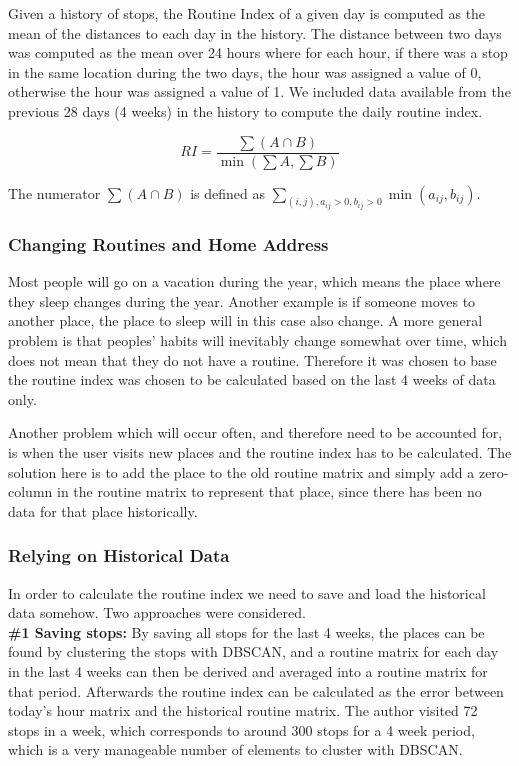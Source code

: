 Given a history of stops, the Routine Index of a given day is computed as the mean of the distances to each day in the history. The distance between two days was computed as the mean over 24 hours where for each hour, if there was a stop in the same location during the two days, the hour was assigned a value of 0, otherwise the hour was assigned a value of 1. We included data available from the previous 28 days (4 weeks) in the history to compute the daily routine index.

$$RI = \frac{\sum (A \cap B)}{\min (\sum A, \sum B)}$$

The numerator $\sum (A \cap B)$ is defined as $\sum_{(i,j) , a_{ij}> 0, b_{ij} > 0} \min (a_{ij}, b_{ij})$.

\subsubsection*{Changing Routines and Home Address}
Most people will go on a vacation during the year, which means the place where they sleep changes during the year. Another example is if someone moves to another place, the place to sleep will in this case also change. A more general problem is that peoples' habits will inevitably change somewhat over time, which does not mean that they do not have a routine. Therefore it was chosen to base the routine index was chosen to be calculated based on the last 4 weeks of data only. 

Another problem which will occur often, and therefore need to be accounted for, is when the user visits new places and the routine index has to be calculated. The solution here is to add the place to the old routine matrix and simply add a zero-column in the routine matrix to represent that place, since there has been no data for that place historically. 

\subsubsection*{Relying on Historical Data}
In order to calculate the routine index we need to save and load the historical data somehow. Two approaches were considered.\\

\textbf{\#1 Saving stops:} By saving all stops for the last 4 weeks, the places can be found by clustering the stops with DBSCAN, and a routine matrix for each day in the last 4 weeks can then be derived and averaged into a routine matrix for that period. Afterwards the routine index can be calculated as the error between today's hour matrix and the historical routine matrix. The author visited 72 stops in a week, which corresponds to around 300 stops for a 4 week period, which is a very manageable number of elements to cluster with DBSCAN.\\

